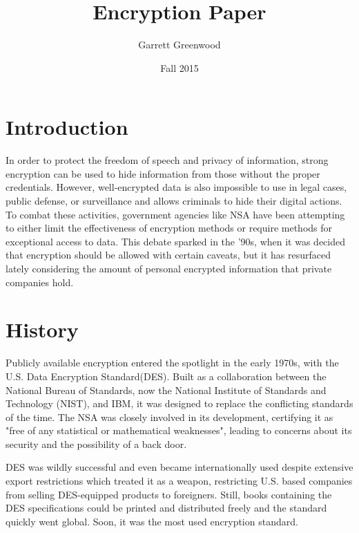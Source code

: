 \documentclass[12pt]{turabian-researchpaper}
\title{Encryption Paper}
\author{Garrett Greenwood}
\date{Fall 2015}
\begin{document}
\maketitle

\section{Introduction}

In order to protect the freedom of speech and privacy of information, strong encryption can be used to hide information from those without the proper credentials.
However, well-encrypted data is also impossible to use in legal cases, public defense, or surveillance and allows criminals to hide their digital actions.
To combat these activities, government agencies like NSA have been attempting to either limit the effectiveness of encryption methods or require methods for exceptional access to data.
This debate sparked in the '90s, when it was decided that encryption should be allowed with certain caveats, but it has resurfaced lately considering the amount of personal encrypted information that private companies hold.


\section{History}
Publicly available encryption entered the spotlight in the early 1970s, with the U.S. Data Encryption Standard(DES).
Built as a collaboration between the National Bureau of Standards, now the National Institute of Standards and Technology (NIST), and IBM, it was designed to replace the conflicting standards of the time.
The NSA was closely involved in its development, certifying it as "free of any statistical or mathematical weaknesses", leading to concerns about its security and the possibility of a back door.

DES was wildly successful and even became internationally used despite extensive export restrictions which treated it as a weapon, restricting U.S. based companies from selling DES-equipped products to foreigners.
Still, books containing the DES specifications could be printed and distributed freely and the standard quickly went global.
Soon, it was the most used encryption standard.
\end{document}
